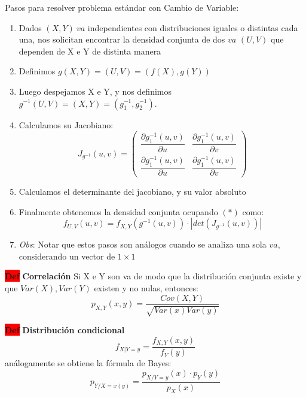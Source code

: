 \documentclass[letterpaper,10.5pt,twocolumn]{article} %
\newcommand{\hlc}[2][yellow]{ \colorbox{#1}{#2} }
\newcommand{\Def}{\hlc[red]{\bfseries Def}}
\begin{document}
Pasos para resolver problema estándar con Cambio de Variable:

\begin{enumerate}[label={(\textit{\roman*})}, leftmargin=*, itemsep=0pt]
    \item Dados $(X, Y)\ va$ independientes con distribuciones iguales o distintas cada una, nos solicitan encontrar la densidad conjunta de dos $va$ $(U,V)$ que dependen de X e Y de distinta manera
    \item Definimos $g(X,Y) = (U,V) = (f(X),g(Y))$
    \item Luego despejamos X e Y, y nos definimos $g^{-1}(U,V) = (X,Y) = (g_{1}^{-1}, g_{2}^{-1})$.
    \item Calculamos su Jacobiano: 
    \begin{equation*}
        J_{g^{-1}}(u,v) =
    \begin{pmatrix}
    \dfrac{\partial{g_{1}^{-1}} (u,v)}{\partial u} & \dfrac{\partial{g_{1}^{-1}} (u,v)}{\partial v}\\
    \dfrac{\partial{g_{1}^{-1}} (u,v)}{\partial u} & \dfrac{\partial{g_{1}^{-1}} (u,v)}{\partial v}
    \end{pmatrix}
    \end{equation*}
    \item Calculamos el determinante del jacobiano, y su valor absoluto
    \item Finalmente obtenemos la densidad conjunta ocupando $(*)$ como:
    \begin{equation*}
        f_{U,V} (u,v) = f_{X,Y} (g^{-1} (u,v)) \cdot |det(J_{g^{-1}} (u,v)) | 
    \end{equation*}
    \item \textit{Obs}: Notar que estos pasos son análogos cuando se analiza una sola $va$, considerando un vector de $1 \times 1$ 
\end{enumerate}

\Def \textbf{Correlación} Si X e Y son va de modo que la distribución conjunta existe y que $Var(X),Var(Y)$ existen y no nulas, entonces:
\begin{equation*}
    p_{X,Y} (x,y) = \dfrac{Cov (X,Y)}{\sqrt{Var(x) Var(y)}}
\end{equation*}

\Def \textbf{Distribución condicional}
\begin{equation*}
    f_{X|Y=y} = \dfrac{f_{X,Y} (x,y)}{f_Y (y)}
\end{equation*}
análogamente se obtiene la fórmula de Bayes:
\begin{equation*}
    p_{Y/X=x(y)} = \dfrac{p_{X/Y=y} (x) \cdot p_Y (y)}{p_X (x)}
\end{equation*}
\end{document}
